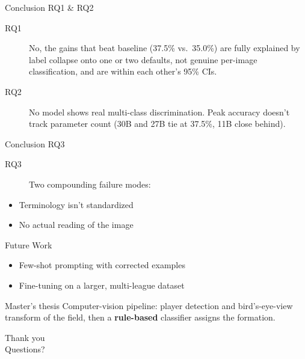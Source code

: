 \documentclass[9pt,aspectratio=169]{beamer}
\begin{document}
\begin{frame}{Conclusion RQ1 \& RQ2}
  \small
  \begin{description}
    \item[RQ1] No, the gains that beat baseline (37.5\% vs.\ 35.0\%) are fully explained by label collapse onto one or two defaults, not genuine per-image classification, and are within each other's 95\% CIs. 
    \item[RQ2] No model shows real multi-class discrimination. Peak accuracy doesn't track parameter count (30B and 27B tie at 37.5\%, 11B close behind).
  \end{description}
\end{frame}

\begin{frame}{Conclusion RQ3}
  \small
  \begin{description}
    \item[RQ3] Two compounding failure modes:
  \end{description}
  \begin{itemize}
    \item Terminology isn't standardized
    \item No actual reading of the image
  \end{itemize}
\end{frame}

\begin{frame}{Future Work}
  \begin{itemize}
    \item Few-shot prompting with corrected examples
    \item Fine-tuning on a larger, multi-league dataset
  \end{itemize}
  \vfill
  \begin{block}{Master's thesis}
    Computer-vision pipeline: player detection and bird's-eye-view transform of the field, then a \textbf{rule-based} classifier assigns the formation.
  \end{block}
\end{frame}

\begin{frame}[plain]
  \centering
  {\Large Thank you}\\[0.3cm]
  Questions?
\end{frame}
\end{document}
